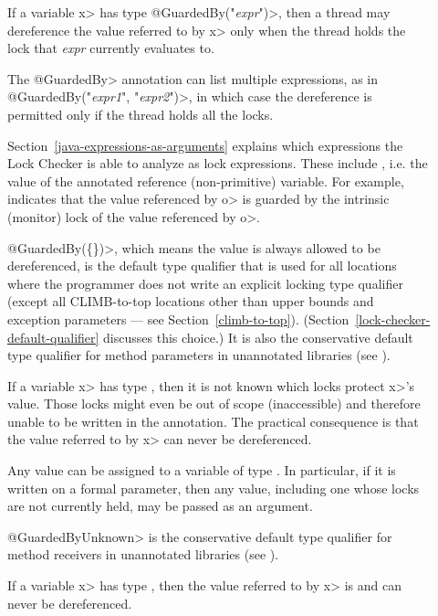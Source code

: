 \begin{description}

\item[]
  If a variable \<x> has type \<@GuardedBy("\emph{expr}")>, then a thread may
  dereference the value referred to by \<x> only when the thread holds the
  lock that \emph{expr} currently evaluates to.

  The \<@GuardedBy> annotation can list multiple expressions, as in
  \<@GuardedBy(\ttlcb"\emph{expr1}", "\emph{expr2}"\ttrcb)>, in which case
  the dereference is
  permitted only if the thread holds all the locks.

  Section~\ref{java-expressions-as-arguments} explains which
  expressions the Lock Checker is able to analyze as lock expressions.
  These include , i.e. the value of the annotated reference
  (non-primitive) variable.  For example, 
  indicates that the value referenced by \<o> is guarded by the intrinsic
  (monitor) lock of the value referenced by \<o>.

  \<@GuardedBy(\{\})>, which means the value is always allowed to be
  dereferenced, is the default type qualifier that is used for all locations
  where the programmer does not
  write an explicit locking type qualifier (except all CLIMB-to-top locations
  other than upper bounds and exception parameters --- see Section~\ref{climb-to-top}).
  (Section~\ref{lock-checker-default-qualifier} discusses this choice.)
  It is also the conservative
  default type qualifier for method parameters in unannotated libraries
  (see ).

\item[]
  If a variable \<x> has type , then
  it is not known which locks protect \<x>'s value.  Those locks might
  even be out of scope (inaccessible) and therefore unable to be written
  in the annotation.
  The practical consequence is that
  the value referred to by \<x> can never be dereferenced.

  Any value can be assigned to a variable of type
  .  In particular, if it is written on a
  formal parameter, then any value,
  including one whose locks are not currently held,
  may be passed as an argument.

  \<@GuardedByUnknown> is the conservative
  default type qualifier for method receivers in unannotated libraries
  (see ).

\item[]
  If a variable \<x> has type , then
  the value referred to by \<x> is  and can never
  be dereferenced.

\end{description}

